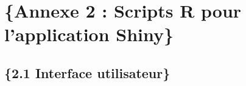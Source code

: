 \documentclass[
  12pt,
]{article}
\begin{document}
\normalsize

\newpage

\hypertarget{annexe-2-scripts-r-pour-lapplication-shiny}{%
\section{\texorpdfstring{\Large\{Annexe 2 : Scripts R pour l'application
Shiny\}}{\{Annexe 2 : Scripts R pour l'application Shiny\}}}\label{annexe-2-scripts-r-pour-lapplication-shiny}}

\hypertarget{interface-utilisateur}{%
\subsection{\texorpdfstring{\large\{2.1 Interface
utilisateur\}}{\{2.1 Interface utilisateur\}}}\label{interface-utilisateur}}

\renewcommand{\baselinestretch}{.85}
\scriptsize
\end{document}
